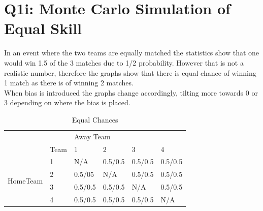 \documentclass[12pt]{article}
\begin{document}
\tableofcontents
\thispagestyle{empty}
\cleardoublepage
\setcounter{page}{1}
\pagebreak

\section{Q1i: Monte Carlo Simulation of Equal Skill}

In an event where the two teams are equally matched the statistics show that one would win 1.5 of the 3 matches due to 1/2 probability. However that is not a realistic number, therefore the graphs show that there is equal chance of winning 1 match as there is of winning 2 matches. \\
When bias is introduced the graphs change accordingly, tilting more towards 0 or 3 depending on where the bias is placed.\\

\begin{table}[H]
\centering
\caption{Equal Chances}
\label{my-label}
\begin{tabular}{ll|l|l|l|l|}
\cline{3-6}
                                                &      & \multicolumn{4}{l|}{Away Team}    \\ \cline{2-6} 
\multicolumn{1}{l|}{}                           & Team & 1      & 2      & 3      & 4      \\ \hline
\multicolumn{1}{|l|}{\multirow{4}{*}{HomeTeam}} & 1    & N/A    & 0.5/0.5 & 0.5/0.5 & 0.5/0.5 \\ \cline{2-6} 
\multicolumn{1}{|l|}{}                          & 2    & 0.5/05 & N/A    & 0.5/0.5 & 0.5/0.5 \\ \cline{2-6} 
\multicolumn{1}{|l|}{}                          & 3    & 0.5/0.5 & 0.5/0.5 & N/A    & 0.5/0.5 \\ \cline{2-6} 
\multicolumn{1}{|l|}{}                          & 4    & 0.5/0.5 & 0.5/0.5 & 0.5/0.5 & N/A    \\ \hline
\end{tabular}
\end{table}
\end{document}
